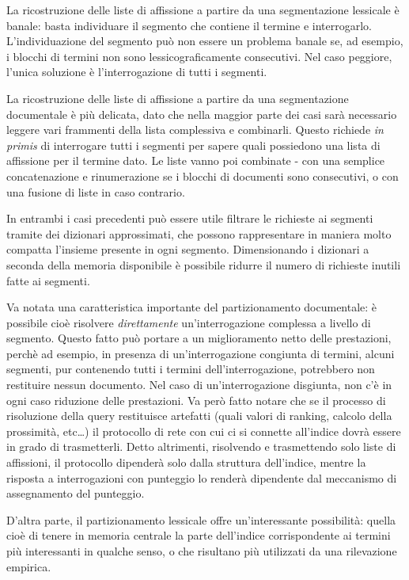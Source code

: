 La ricostruzione delle liste di affissione a partire da una segmentazione lessicale è banale: basta individuare il segmento che contiene il termine e interrogarlo. L'individuazione del segmento può non essere un problema banale se, ad esempio, i blocchi di termini non sono lessicograficamente consecutivi. Nel caso peggiore, l'unica soluzione è l'interrogazione di tutti i segmenti.

La ricostruzione delle liste di affissione a partire da una segmentazione documentale è più delicata, dato che nella maggior parte dei casi sarà necessario leggere vari frammenti della lista complessiva e combinarli. Questo richiede \textit{in primis} di interrogare tutti i segmenti per sapere quali possiedono una lista di affissione per il termine dato. Le liste vanno poi combinate - con una semplice concatenazione e rinumerazione se i blocchi di documenti sono consecutivi, o con una fusione di liste in caso contrario.

In entrambi i casi precedenti può essere utile filtrare le richieste ai segmenti tramite dei dizionari approssimati, che possono rappresentare in maniera molto compatta l'insieme presente in ogni segmento. Dimensionando i dizionari a seconda della memoria disponibile è possibile ridurre il numero di richieste inutili fatte ai segmenti.

Va notata una caratteristica importante del partizionamento documentale: è possibile cioè risolvere \textit{direttamente} un'interrogazione complessa a livello di segmento. Questo fatto può portare a un miglioramento netto delle prestazioni, perchè ad esempio, in presenza di un'interrogazione congiunta di termini, alcuni segmenti, pur contenendo tutti i termini dell'interrogazione, potrebbero non restituire nessun documento. Nel caso di un'interrogazione disgiunta, non c'è in ogni caso riduzione delle prestazioni. Va però fatto notare che se il processo di risoluzione della query restituisce artefatti (quali valori di ranking, calcolo della prossimità, etc\dots) il protocollo di rete con cui ci si connette all'indice dovrà essere in grado di trasmetterli. Detto altrimenti, risolvendo e trasmettendo solo liste di affissioni, il protocollo dipenderà solo dalla struttura dell'indice, mentre la risposta a interrogazioni con punteggio lo renderà dipendente dal meccanismo di assegnamento del punteggio.

D'altra parte, il partizionamento lessicale offre un'interessante possibilità: quella cioè di tenere in memoria centrale la parte dell'indice corrispondente ai termini più interessanti in qualche senso, o che risultano più utilizzati da una rilevazione empirica.
